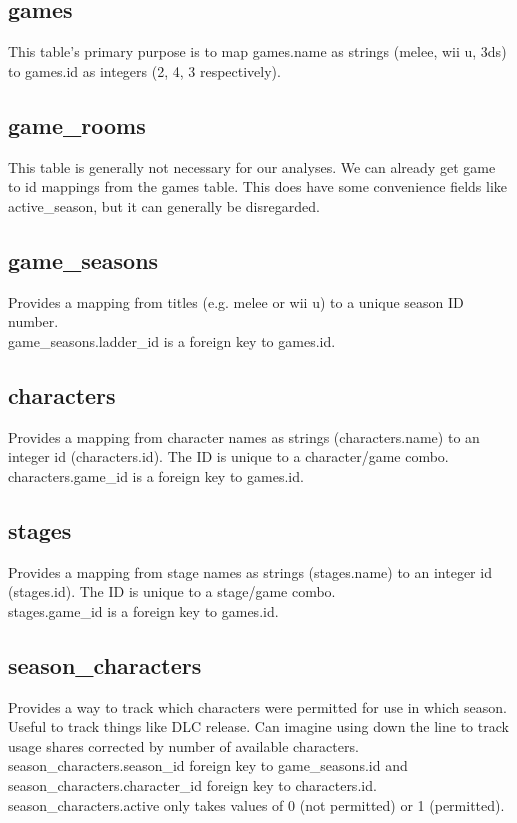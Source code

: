 \documentclass[12pt]{article}
\begin{document}
\subsection{games} %
\label{sub:games}
This table's primary purpose is to map games.name as strings (melee, wii u, 3ds) to games.id as integers (2, 4, 3 respectively). 

\subsection{game\_rooms} %
\label{sub:game_rooms}
This table is generally not necessary for our analyses. We can already get game to id mappings from the games table. This does have some convenience fields like active\_season, but it can generally be disregarded.

\subsection{game\_seasons} %
\label{sub:game_seasons}
Provides a mapping from titles (e.g. melee or wii u) to a unique season ID number. \\
game\_seasons.ladder\_id is a foreign key to games.id.

\subsection{characters} %
\label{sub:characters}
Provides a mapping from character names as strings (characters.name) to an integer id (characters.id).
The ID is unique to a character/game combo. \\
characters.game\_id is a foreign key to games.id.

\subsection{stages} %
\label{sub:stages}
Provides a mapping from stage names as strings (stages.name) to an integer id (stages.id).
The ID is unique to a stage/game combo. \\
stages.game\_id is a foreign key to games.id.

\subsection{season\_characters} %
\label{sub:season_characters}
Provides a way to track which characters were permitted for use in which season. Useful to track things like DLC release. Can imagine using down the line to track usage shares corrected by number of available characters.\\
season\_characters.season\_id foreign key to game\_seasons.id and season\_characters.character\_id foreign key to characters.id. \\
season\_characters.active only takes values of 0 (not permitted) or 1 (permitted).
\end{document}
